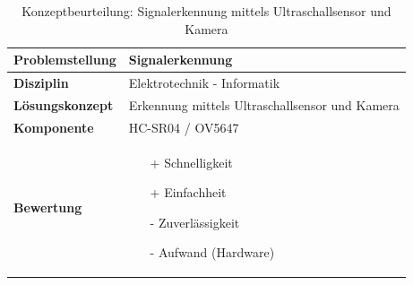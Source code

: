 \documentclass[../../main.tex]{subfiles}
\begin{document}
    \vspace{1cm}
    \begin{flushleft}
        \begin{table}[H]
        \begin{tabular}{ | l | p{11cm} |}
        \hline
        \textbf{Problemstellung} & Signalerkennung \\ \hline
        \textbf{Disziplin} & Elektrotechnik - Informatik \\ \hline
        \textbf{Lösungskonzept} & Erkennung mittels Ultraschallsensor und Kamera \\ \hline
        \textbf{Komponente} & HC-SR04 / OV5647 \\ \hline
        \textbf{Bewertung} &  \begin{itemize}
                                \item[+] Schnelligkeit
                                \item[+] Einfachheit
                                \item[-] Zuverlässigkeit
                                \item[-] Aufwand (Hardware)   
                              \end{itemize} \\ \hline
        \end{tabular}
        \caption{Konzeptbeurteilung: Signalerkennung mittels Ultraschallsensor und Kamera}
        \label{tab:konzept_wurfel_Stereokamera}
    \end{table}
    \end{flushleft}
\end{document}
